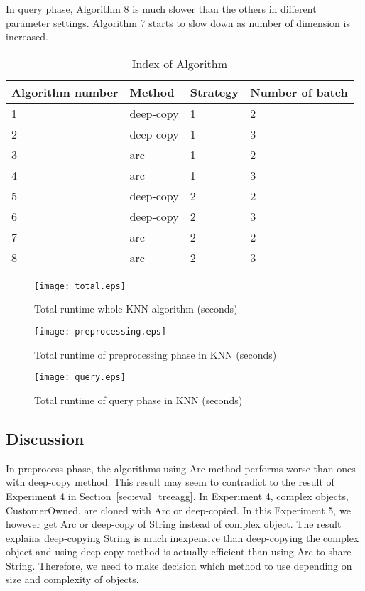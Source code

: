 In query phase, Algorithm 8 is much slower than the others in different parameter settings.
Algorithm 7 starts to slow down as number of dimension is increased. 


\begin{table}
    \renewcommand{\arraystretch}{1.2}
    \begin{tabular}{|l|l|l|l|}
    \hline
    Algorithm number & Method    & Strategy & Number of batch \\ \hline
    1                & deep-copy & 1        & 2               \\ \hline
    2                & deep-copy & 1        & 3               \\ \hline
    3                & arc       & 1        & 2               \\ \hline
    4                & arc       & 1        & 3               \\ \hline
    5                & deep-copy & 2        & 2               \\ \hline
    6                & deep-copy & 2        & 3               \\ \hline
    7                & arc       & 2        & 2               \\ \hline
    8                & arc       & 2        & 3               \\ \hline
    \end{tabular}
    \caption{Index of Algorithm}
    \label{tab:algorithm}
 \end{table}

\begin{figure}[htb]
    \texttt{[image: total.eps]}
    \caption{Total runtime whole KNN algorithm (seconds)}
    \label{fig:total}
\end{figure}

\begin{figure}[htb]
    \texttt{[image: preprocessing.eps]}
    \caption{Total runtime of preprocessing phase in KNN (seconds)}
    \label{fig:preprocess}
\end{figure}


\begin{figure}[htb]
    \texttt{[image: query.eps]}
    \caption{Total runtime of query phase in KNN (seconds)}
    \label{fig:query}
\end{figure}


\subsection{Discussion}
\label{sec:history}
In preprocess phase, the algorithms using Arc method performs worse than ones with deep-copy method. 
This result may seem to contradict to the result of Experiment 4 in Section~\ref{sec:eval_treeagg}.
In Experiment 4, complex objects, CustomerOwned, are cloned with Arc or deep-copied. 
In this Experiment 5, we however get Arc or deep-copy of String instead of complex object.
The result explains deep-copying String is much inexpensive than deep-copying the complex object and 
using deep-copy method is actually efficient than using Arc to share String. 
Therefore, we need to make decision which method to use depending on size and complexity of objects.

